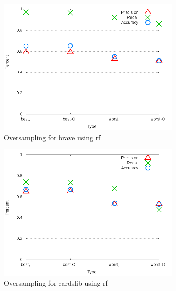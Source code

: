 \begin{figure}[!t]
\centering
\includegraphics[width=0.8\textwidth]{images/rf/test_4/brave_sample_range.png}
\caption{Oversampling for brave using \gls{rf}}
\label{fig:test_4_brave_rf}
\end{figure}

\begin{figure}[!t]
\centering
\includegraphics[width=0.8\textwidth]{images/rf/test_4/cardslib_sample_range.png}
\caption{Oversampling for cardslib using \gls{rf}}
\label{fig:test_4_cardslib_rf}
\end{figure}

